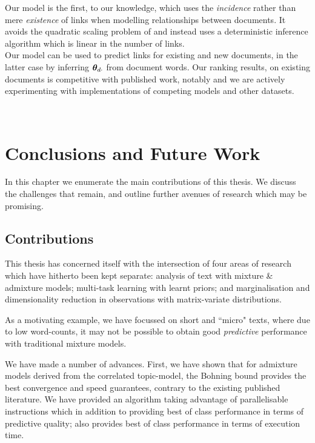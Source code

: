 Our model is the first, to our knowledge, which uses the \emph{incidence} rather than mere \emph{existence} of links when modelling relationships between documents. It avoids the quadratic scaling problem of \cite{Chang2009a} and instead uses a deterministic inference algorithm which is linear in the number of links.\\

Our model can be used to predict links for existing and new documents, in the latter case by inferring ${ \bm \theta_{d\cdot} }$ from document words. Our ranking results, on existing documents is competitive with published work, notably \cite{Chang2009a}\cite{Neiswanger2014} and we are actively experimenting with implementations of competing models and other datasets.



\

\chapter{Conclusions and Future Work}
In this chapter we enumerate the main contributions of this thesis. We discuss the challenges that remain, and outline further avenues of research which may be promising.

\section{Contributions}
This thesis has concerned itself with the intersection of four areas of research which have hitherto been kept separate: analysis of text with mixture \& admixture models; multi-task learning with learnt priors; and marginalisation and dimensionality reduction in observations with matrix-variate distributions.

As a motivating example, we have focussed on short and ``micro" texts, where due to low word-counts, it may not be possible to obtain good \emph{predictive} performance with traditional mixture models. 

We have made a number of advances. First, we have shown that for admixture models derived from the correlated topic-model\cite{Blei2006}, the Bohning bound provides the best convergence and speed guarantees, contrary to the existing published literature\cite{Wang2013}. We have provided an algorithm taking advantage of parallelisable instructions which in addition to providing best of class performance in terms of predictive quality; also provides best of class performance in terms of execution time.

